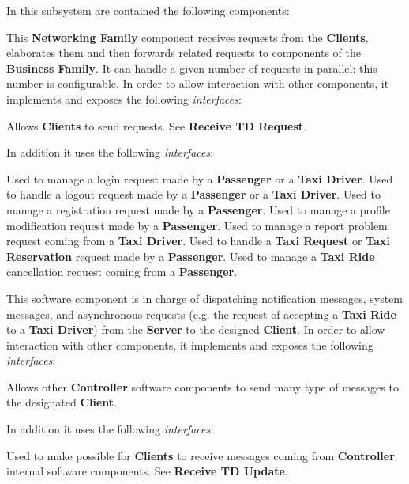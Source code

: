 \begin{itemize}
	In this subsystem are contained the following components:
	\begin{itemize}
		This \textbf{Networking Family} component receives requests from the \textbf{Clients}, elaborates them and then forwards related requests to components of the \textbf{Business Family}.
		It can handle a given number of requests in parallel: this number is configurable.
		In order to allow interaction with other components, it implements and exposes the following \textit{interfaces}:
		\begin{itemize}
			 Allows \textbf{Clients} to send requests.
			 See \textbf{Receive TD Request}.
		\end{itemize}
		In addition it uses the following \textit{interfaces}:
		\begin{itemize}
			 Used to manage a login request made by a \textbf{Passenger} or a \textbf{Taxi Driver}.
			 Used to handle a logout request made by a \textbf{Passenger} or a \textbf{Taxi Driver}.
			 Used to manage a registration request made by a \textbf{Passenger}.
			 Used to manage a profile modification request made by a \textbf{Passenger}.
			 Used to manage a report problem request coming from a \textbf{Taxi Driver}.
			 Used to handle a \textbf{Taxi Request} or \textbf{Taxi Reservation} request made by a \textbf{Passenger}.
			 Used to manage a \textbf{Taxi Ride} cancellation request coming from a \textbf{Passenger}.
		\end{itemize}
		
		 This software component is in charge of dispatching notification messages, system messages, and asynchronous requests (e.g. the request of accepting a \textbf{Taxi Ride} to a \textbf{Taxi Driver}) from the \textbf{Server} to the designed \textbf{Client}.
		In order to allow interaction with other components, it implements and exposes the following \textit{interfaces}:
		\begin{itemize}
			 Allows other \textbf{Controller} software components to send many type of messages to the designated \textbf{Client}.
		\end{itemize}
			In addition it uses the following \textit{interfaces}:
		\begin{itemize}
			 Used to make possible for \textbf{Clients} to receive messages coming from \textbf{Controller} internal software components.
			 See \textbf{Receive TD Update}.	
		\end{itemize}
		

\end{itemize}
\end{itemize}
